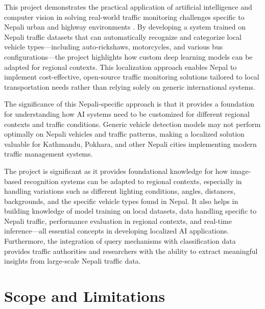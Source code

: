 \documentclass[12pt,a4paper]{report}
\begin{document}
This project demonstrates the practical application of artificial intelligence and computer vision in solving real-world traffic monitoring challenges specific to Nepali urban and highway environments \cite{lecun2015deep}. By developing a system trained on Nepali traffic datasets that can automatically recognize and categorize local vehicle types—including auto-rickshaws, motorcycles, and various bus configurations—the project highlights how custom deep learning models can be adapted for regional contexts. This localization approach enables Nepal to implement cost-effective, open-source traffic monitoring solutions tailored to local transportation needs rather than relying solely on generic international systems.

The significance of this Nepali-specific approach is that it provides a foundation for understanding how AI systems need to be customized for different regional contexts and traffic conditions. Generic vehicle detection models may not perform optimally on Nepali vehicles and traffic patterns, making a localized solution valuable for Kathmandu, Pokhara, and other Nepali cities implementing modern traffic management systems.

The project is significant as it provides foundational knowledge for how image-based recognition systems can be adapted to regional contexts, especially in handling variations such as different lighting conditions, angles, distances, backgrounds, and the specific vehicle types found in Nepal. It also helps in building knowledge of model training on local datasets, data handling specific to Nepali traffic, performance evaluation in regional contexts, and real-time inference—all essential concepts in developing localized AI applications. Furthermore, the integration of query mechanisms with classification data provides traffic authorities and researchers with the ability to extract meaningful insights from large-scale Nepali traffic data.

\section{Scope and Limitations}
\end{document}
